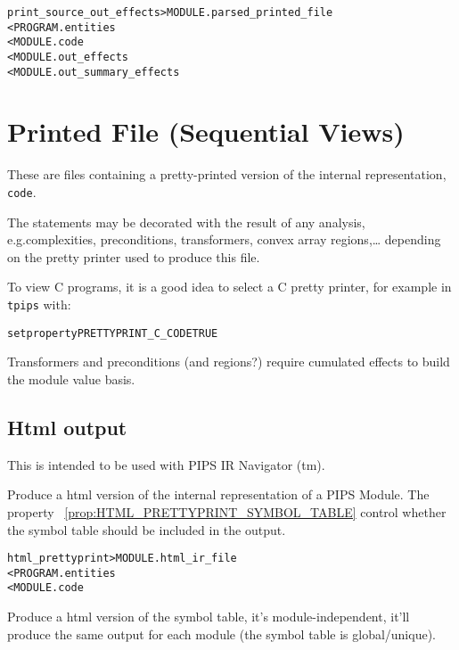 \documentclass[a4paper]{report}
\newenvironment{PipsMake}{\begin{alltt}}{\end{alltt}}
\newcommand{\PipsPropRef}[1]{\texttt{\detokenize{#1}}~\ref{prop:#1}}
\newenvironment{PipsPass}[1]{\label{pass:#1}}{}
\begin{document}
\begin{PipsMake}
print_source_out_effects       > MODULE.parsed_printed_file
        < PROGRAM.entities
        < MODULE.code
        < MODULE.out_effects
        < MODULE.out_summary_effects
\end{PipsMake}



\section{Printed File (Sequential Views)}


\begin{PipsPass}{printed_file}
These are files containing a pretty-printed version of the internal
representation, \verb+code+.

The statements may be decorated with the result of any analysis,
e.g.complexities, preconditions, transformers, convex array regions,\ldots{} depending on
the pretty printer used to produce this file.

To view C programs, it is a good idea to select a C pretty printer, for
example in \texttt{tpips} with:
\begin{alltt}
setproperty PRETTYPRINT_C_CODE TRUE
\end{alltt}

Transformers and preconditions (and regions?) require cumulated effects
to build the module value basis.
\end{PipsPass}



\subsection{Html output}

This is intended to be used with PIPS IR Navigator (tm).

\begin{PipsPass}{html_prettyprint}
Produce a html version of the internal representation of a PIPS Module.
The property \PipsPropRef{HTML_PRETTYPRINT_SYMBOL_TABLE} control whether the
symbol table should be included in the output.
\end{PipsPass}


\begin{PipsMake}
html_prettyprint > MODULE.html_ir_file
         < PROGRAM.entities
         < MODULE.code
\end{PipsMake}

\begin{PipsPass}{html_prettyprint_symbol_table}
Produce a html version of the symbol table, it's module-independent, it'll
produce the same output for each module (the symbol table is global/unique).
\end{PipsPass}
\end{document}
